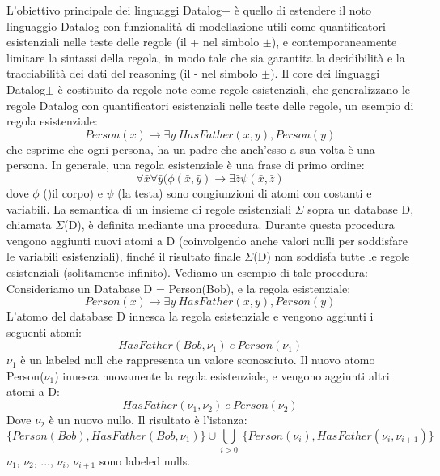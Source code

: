 L'obiettivo principale dei linguaggi Datalog$\pm$ è quello di estendere il noto linguaggio Datalog con funzionalità di modellazione utili come quantificatori esistenziali nelle teste delle regole (il + nel simbolo $\pm $), e contemporaneamente limitare la sintassi della regola, in modo tale che sia garantita la decidibilità e la tracciabilità dei dati del reasoning (il - nel simbolo $\pm $). \newline
Il core dei linguaggi Datalog$\pm $ è costituito da regole note come regole esistenziali, che generalizzano le regole Datalog con quantificatori esistenziali nelle teste delle regole, un esempio di regola esistenziale: \[Person(x) \rightarrow \exists y ~HasFather(x,y), Person(y)\]
che esprime che ogni persona, ha un padre che anch'esso a sua volta è una persona. \newline
In generale, una regola esistenziale è una frase di primo ordine: \[\forall \bar{x} \forall \bar{y} (\phi(\bar{x}, \bar{y}) \rightarrow \exists \bar{z} \psi (\bar{x}, \bar{z})\]
dove $\phi$  ()il corpo) e $\psi$  (la testa) sono congiunzioni di atomi con costanti e variabili. \newline
La semantica di un insieme di regole esistenziali $\Sigma$ sopra un database D, chiamata $\Sigma$(D), è definita mediante una procedura. Durante questa procedura vengono aggiunti nuovi atomi a D (coinvolgendo anche valori nulli per soddisfare le variabili esistenziali), finché il risultato finale $\Sigma$(D) non soddisfa tutte le regole esistenziali (solitamente infinito). \newline
Vediamo un esempio di tale procedura: \newline
Consideriamo un Database D = {Person(Bob)}, e la regola esistenziale: \[Person(x) \rightarrow \exists y ~HasFather(x,y), Person(y)\]
L'atomo del database D innesca la regola esistenziale e vengono aggiunti i seguenti atomi: \[HasFather(Bob, \nu_{1}) ~e~ Person(\nu_{1})\]
$\nu_{1}$ è un labeled null che rappresenta un valore sconosciuto.\newline
Il nuovo atomo Person($\nu_{1}$) innesca nuovamente la regola esistenziale, e vengono aggiunti altri atomi a D: \[HasFather(\nu_{1}, \nu_{2}) ~e~ Person(\nu_{2})\]
Dove $\nu_{2}$ è un nuovo nullo. Il risultato è l'istanza: \[\{Person(Bob), HasFather(Bob, \nu_{1})\} \cup \underset{i>0}{\bigcup} ~\{Person(\nu_{i}), HasFather(\nu_{i}, \nu_{i+1})\}\]
$\nu_{1}$, $\nu_{2}$, ..., $\nu_{i}$, $\nu_{i+1}$ sono labeled nulls. \newline \newline
